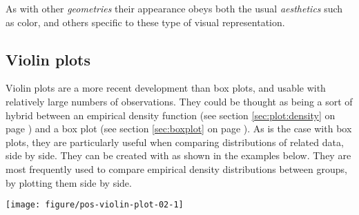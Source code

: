 \documentclass[krantz2]{krantz}\usepackage{knitr}%
\begin{document}
As with other \emph{geometries} their appearance obeys both the usual \emph{aesthetics} such as color, and others specific to these type of visual representation.

\subsection{Violin plots}\label{sec:plot:violin}

Violin plots are a more recent development than box plots, and usable with relatively large numbers of observations. They could be thought as being a sort of hybrid between an empirical density function (see section \ref{sec:plot:density} on page \pageref{sec:plot:density}) and a box plot (see section \ref{sec:boxplot} on page \pageref{sec:boxplot}). As is the case with box plots, they are particularly useful when comparing distributions of related data, side by side. They can be created with   as shown in the examples below. They are most frequently used to compare empirical density distributions between groups, by plotting them side by side.

\begin{knitrout}\footnotesize
{}\color{fgcolor}\begin{kframe}
\begin{alltt}
  \hlopt{+}
  \hlstd{()}
\end{alltt}
\end{kframe}
\end{knitrout}

\begin{knitrout}\footnotesize
{}\color{fgcolor}\begin{kframe}
\begin{alltt}
    \hlopt{+}
  \hlstd{(} \hlstd{=} \hlstd{)} \hlopt{+}
  \hlstd{(} \hlstd{=} \hlstd{,}  \hlstd{=} \hlstd{(}\hlstd{),}
              \hlstd{=} \hlstd{,}  \hlstd{=} \hlstd{)}
\end{alltt}
\end{kframe}

{\centering \texttt{[image: figure/pos-violin-plot-02-1]} 

}



\end{knitrout}
\end{document}
